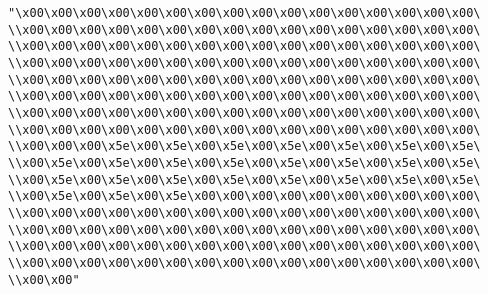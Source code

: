 \verb|"\x00\x00\x00\x00\x00\x00\x00\x00\x00\x00\x00\x00\x00\x00\x00\x00\|\newline
\verb|\\x00\x00\x00\x00\x00\x00\x00\x00\x00\x00\x00\x00\x00\x00\x00\x00\|\newline
\verb|\\x00\x00\x00\x00\x00\x00\x00\x00\x00\x00\x00\x00\x00\x00\x00\x00\|\newline
\verb|\\x00\x00\x00\x00\x00\x00\x00\x00\x00\x00\x00\x00\x00\x00\x00\x00\|\newline
\verb|\\x00\x00\x00\x00\x00\x00\x00\x00\x00\x00\x00\x00\x00\x00\x00\x00\|\newline
\verb|\\x00\x00\x00\x00\x00\x00\x00\x00\x00\x00\x00\x00\x00\x00\x00\x00\|\newline
\verb|\\x00\x00\x00\x00\x00\x00\x00\x00\x00\x00\x00\x00\x00\x00\x00\x00\|\newline
\verb|\\x00\x00\x00\x00\x00\x00\x00\x00\x00\x00\x00\x00\x00\x00\x00\x00\|\newline
\verb|\\x00\x00\x00\x5e\x00\x5e\x00\x5e\x00\x5e\x00\x5e\x00\x5e\x00\x5e\|\newline
\verb|\\x00\x5e\x00\x5e\x00\x5e\x00\x5e\x00\x5e\x00\x5e\x00\x5e\x00\x5e\|\newline
\verb|\\x00\x5e\x00\x5e\x00\x5e\x00\x5e\x00\x5e\x00\x5e\x00\x5e\x00\x5e\|\newline
\verb|\\x00\x5e\x00\x5e\x00\x5e\x00\x00\x00\x00\x00\x00\x00\x00\x00\x00\|\newline
\verb|\\x00\x00\x00\x00\x00\x00\x00\x00\x00\x00\x00\x00\x00\x00\x00\x00\|\newline
\verb|\\x00\x00\x00\x00\x00\x00\x00\x00\x00\x00\x00\x00\x00\x00\x00\x00\|\newline
\verb|\\x00\x00\x00\x00\x00\x00\x00\x00\x00\x00\x00\x00\x00\x00\x00\x00\|\newline
\verb|\\x00\x00\x00\x00\x00\x00\x00\x00\x00\x00\x00\x00\x00\x00\x00\x00\|\newline
\verb|\\x00\x00"|\newline

